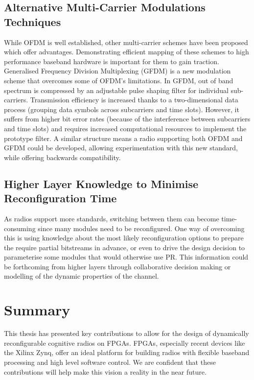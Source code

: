 \subsection{Alternative Multi-Carrier Modulations Techniques}
While OFDM is well established, other multi-carrier schemes have been proposed which offer advantages. Demonstrating efficient mapping of these schemes to high performance baseband hardware is important for them to gain traction.
Generalised Frequency Division Multiplexing (GFDM) is a new modulation scheme that overcomes some of OFDM's limitations.
In GFDM, out of band spectrum is compressed by an adjustable pulse shaping filter for individual sub-carriers. Transmission efficiency is increased thanks to a two-dimensional data process (grouping data symbols across subcarriers and time slots).
However, it suffers from higher bit error rates (because of the interference between subcarriers and time slots) and requires increased computational resources to implement the prototype filter.
A similar structure means a radio supporting both OFDM and GFDM could be developed, allowing experimentation with this new standard, while offering backwards compatibility.

\subsection{Higher Layer Knowledge to Minimise Reconfiguration Time}
As radios support more standards, switching between them can become time-consuming since many modules need to be reconfigured. One way of overcoming this is using knowledge about the most likely reconfiguration options to prepare the require partial bitstreams in advance, or even to drive the design decision to parameterise some modules that would otherwise use PR.
This information could be forthcoming from higher layers through collaborative decision making or modelling of the dynamic properties of the channel.

\section{Summary}

This thesis has presented key contributions to allow for the design of dynamically reconfigurable cognitive radios on FPGAs. FPGAs, especially recent devices like the Xilinx Zynq, offer an ideal platform for building radios with flexible baseband processing and high level software control. We are confident that these contributions will help make this vision a reality in the near future.
